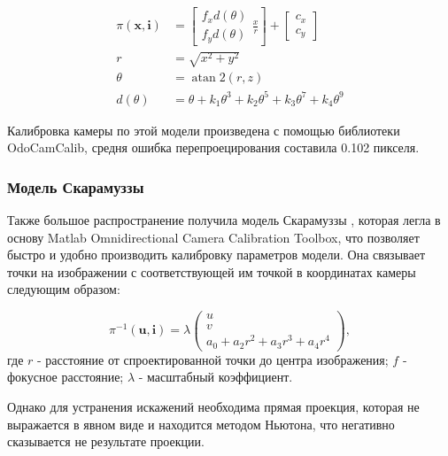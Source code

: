 \begin{equation}
\begin{aligned}
	\pi(\mathbf{x}, \mathbf{i}) &=\left[\begin{array}{l}
	f_{x} d(\theta) \\
	f_{y} d(\theta)
	\end{array} \frac{x}{r}\right]+\left[\begin{array}{c}
	c_{x} \\
	c_{y}
	\end{array}\right] \\
	r &=\sqrt{x^{2}+y^{2}} \\
	\theta &=\operatorname{atan} 2(r, z) \\
	d(\theta) &=\theta+k_{1} \theta^{3}+k_{2} \theta^{5}+k_{3} \theta^{7}+k_{4} \theta^{9}
\end{aligned}
\end{equation}

Калибровка камеры по этой модели произведена с помощью библиотеки OdoCamCalib, средня ошибка перепроецирования 
составила 0.102 пикселя. 

\subsubsection{Модель Скарамуззы}

Также большое распространение получила модель Скарамуззы \cite{scaramuzza}, которая легла в основу Matlab Omnidirectional 
Camera Calibration Toolbox, что позволяет быстро и удобно производить калибровку параметров модели.  Она связывает точки 
на изображении с соответствующей им точкой в координатах камеры следующим образом:

\begin{equation}	
    \pi^{-1}(\mathbf{u}, \mathbf{i}) = \lambda \begin{pmatrix}u\\v\\a_0 + a_2 r^2 + a_3 r^3 + a_4 r^4\end{pmatrix},
    \label{eqn:scaramuzza}
\end{equation}
где  $r$ - расстояние от спроектированной точки до центра изображения; $f$ - фокусное расстояние; $\lambda$ - масштабный коэффициент.

Однако для устранения искажений необходима прямая проекция, которая не выражается в явном виде  и находится методом 
Ньютона, что негативно сказывается не результате проекции. 

